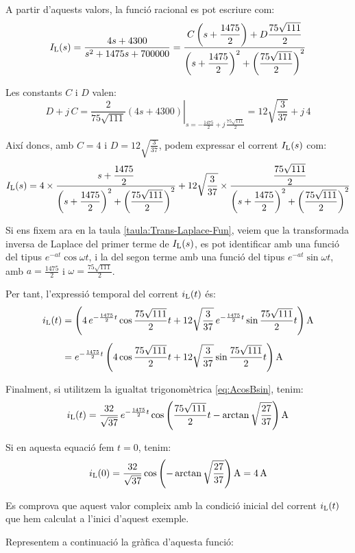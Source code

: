 \begin{exemple}
    A partir d'aquests valors, la  funció racional es pot escriure com:
    \[
        I_\mathrm{L}(s) =
        \frac{4 s+ 4300}{s^2 +1475 s + 700000} =
        \frac{C\left(s+\dfrac{1475}{2}\right)+D\dfrac{75\sqrt{111}}{2}}
        {\left(s+\dfrac{1475}{2}\right)^2+\left(\dfrac{75\sqrt{111}}{2}\right)^2}
    \]

    Les constants $C$ i $D$ valen:
    \[
    D + j\,C = \left.\frac{2}{75\sqrt{111}}(4 s
    +4300)\right|_{s=-\frac{1475}{2} + j\,\frac{75\sqrt{111}}{2}}=
    12\sqrt{\frac{3}{37}} +j\,4
    \]

    Així doncs, amb $C=4$ i $D=12\sqrt{\frac{3}{37}}$, podem expressar
    el corrent $I_\mathrm{L}(s)$ com:
    \[
        I_\mathrm{L}(s) = 4\times\frac{s+\dfrac{1475}{2}}
        {\left(s+\dfrac{1475}{2}\right)^2+\left(\dfrac{75\sqrt{111}}{2}\right)^2}
        + 12\sqrt{\frac{3}{37}}\times\frac{\dfrac{75\sqrt{111}}{2}}
        {\left(s+\dfrac{1475}{2}\right)^2+\left(\dfrac{75\sqrt{111}}{2}\right)^2}
    \]


     Si ens fixem ara en la taula \vref{taula:Trans-Laplace-Fun},
    veiem que la transformada inversa de Laplace del primer terme de
    $I_\mathrm{L}(s)$, es pot identificar amb una funció del tipus
    $e^{-at}\cos\omega t$, i la del segon terme amb una funció del tipus
    $e^{-at}\sin\omega t$, amb $a=\frac{1475}{2}$ i
    $\omega=\frac{75\sqrt{111}}{2}$.

    Per tant, l'expressió temporal del corrent $i_\mathrm{L}(t)$ és:
    \[\begin{split}
        i\ped{L}(t) &= \left( 4\, e^{-\frac{1475}{2}t} \cos \frac{75\sqrt{111}}{2} t +
        12\sqrt{\frac{3}{37}}\, e^{-\frac{1475}{2}t} \sin
        \frac{75\sqrt{111}}{2}t \right) \unit{A} \\[1ex] 
        &= e^{-\frac{1475}{2}t} \left( 4
        \cos \frac{75\sqrt{111}}{2} t + 12\sqrt{\frac{3}{37}}\sin
        \frac{75\sqrt{111}}{2}t\right) \unit{A}
    \end{split}\]

    Finalment, si utilitzem la igualtat trigonomètrica
    \eqref{eq:AcosBsin}, tenim:
    \[
    i\ped{L}(t) = \frac{32}{\sqrt{37}}\,e^{-\frac{1475}{2}t}
    \cos\left(\frac{75\sqrt{111}}{2} t - \arctan
    \sqrt{\frac{27}{37}}\right) \unit{A}
    \]

    Si en aquesta equació fem $t=0$, tenim:
    \[
        i\ped{L}(0) = \frac{32}{\sqrt{37}} \cos\left( - \arctan
    \sqrt{\frac{27}{37}}\right) \unit{A} = \qty{4}{A}
    \]

    Es comprova que aquest valor compleix amb la condició inicial del
    corrent $i_\mathrm{L}(t)$ que hem calculat a l'inici d'aquest exemple.

    Representem a continuació la gràfica d'aquesta funció:

    \begin{center}
        
    \end{center}
\end{exemple}


